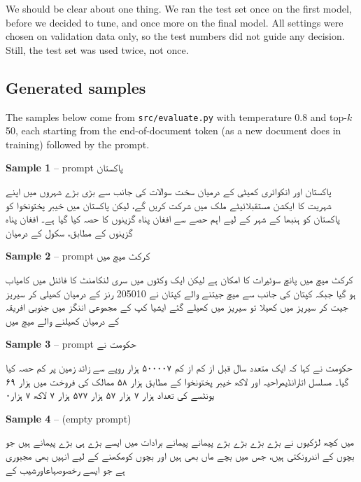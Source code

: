 \documentclass[11pt,a4paper]{article}
\newcommand{\ur}[1]{\texturdu{#1}}
\begin{document}
We should be clear about one thing. We ran the test set once on the first model, before we decided to tune, and once more on the final model. All settings were chosen on validation data only, so the test numbers did not guide any decision. Still, the test set was used twice, not once.

\subsection*{Generated samples}

The samples below come from \texttt{src/evaluate.py} with temperature 0.8 and top-$k$ 50, each starting from the end-of-document token (as a new document does in training) followed by the prompt.

\medskip\noindent\textbf{Sample 1} -- prompt \ur{پاکستان}\par\nopagebreak
\begin{urdu}پاکستان اور انکوائری کمیٹی کے درمیان سخت سوالات کی جانب سے بڑی بڑے شہروں میں اپنے شہریت کا ایکشن مستقبلائیٹے ملک میں شرکت کریں گے، لیکن پاکستان میں خیبر پختونخوا کو پاکستان کو ہنبھا کے شہر کے لیے اہم حصے سے افغان پناہ گزینوں کا حصہ کیا گیا ہے۔ افغان پناہ گزینوں کے مطابق، سکول کے درمیان\end{urdu}

\medskip\noindent\textbf{Sample 2} -- prompt \ur{کرکٹ میچ میں}\par\nopagebreak
\begin{urdu}کرکٹ میچ میں پانچ سوئیرات کا امکان ہے لیکن ایک وکٹوں میں سری لنکامنٹ کا فائنل میں کامیاب ہو گیا جبکہ کپتان کی جانب سے میچ جیتنے والے کپتان نے 205010 رنز کے درمیان کھیلی کر سیریز جیت کر سیریز میں کھیلا تو سیریز میں کھیلے گئے ایشیا کپ کے مجموعی اننگز میں جنوبی افریقہ کے درمیان کھیلنے والے میچ میں\end{urdu}

\medskip\noindent\textbf{Sample 3} -- prompt \ur{حکومت نے}\par\nopagebreak
\begin{urdu}حکومت نے کہا کہ ایک متعدد سال قبل از کم از کم ۵۰۰۰۰۷ ہزار روپے سے زائد زمین پر کم حصہ کیا گیا۔ مسلسل اتارانڈیمراحیہ اور لاکھ خیبر پختونخوا کے مطابق ہزار ۵۸ ممالک کی فروخت میں ہزار ۶۹ یونٹسے کی تعداد ہزار ۷ ہزار ۵۷ ہزار ۵۷۷ ہزار ۷ لاکھ ۷ ہزار۰\end{urdu}

\medskip\noindent\textbf{Sample 4} -- (empty prompt)\par\nopagebreak
\begin{urdu}میں کچھ لڑکیوں نے بڑے بڑے بڑے بڑے پیمانے پیمانے برادات میں ایسے بڑے ہی بڑے پیمانے ہیں جو بچوں کے اندرونکتی ہیں، جس میں بچے ماں بھی ہیں اور بچوں کومکھنے کے لیے انہیں بھی مجبوری ہے جو ایسے رخصوصہاعاورشیب کے\end{urdu}
\end{document}
